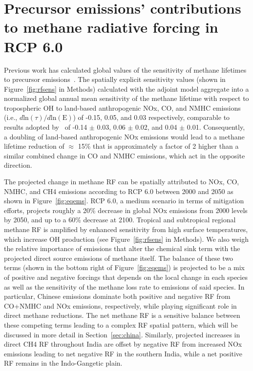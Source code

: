 \section{Precursor emissions' contributions to methane radiative forcing in RCP 6.0}

Previous work has calculated global values of the sensitivity of methane lifetimes to precursor emissions~\citep{ref:fry2012,ref:holmes2013}. The spatially explicit sensitivity values (shown in Figure~\ref{fig:rfsens} in Methods) calculated with the adjoint model aggregate into a normalized global annual mean sensitivity of the methane lifetime with respect to tropospheric OH to land-based anthropogenic NOx, CO, and NMHC emissions (i.e., $d \mathrm{ln}(\tau)/d\mathrm{ln}(\mathrm{E})$) of -0.15, 0.05, and 0.03 respectively, comparable to results adopted by~\citet{ref:holmes2013} of -0.14 $\pm$ 0.03, 0.06 $\pm$ 0.02, and 0.04 $\pm$ 0.01. Consequently, a doubling of land-based anthropogenic NOx emissions would lead to a methane lifetime reduction of $\approx$ 15\% that is approximately a factor of 2 higher than a similar combined change in CO and NMHC emissions, which act in the opposite direction.  


The projected change in methane RF can be spatially attributed to NOx, CO, NMHC, and CH4 emissions according to RCP 6.0 between 2000 and 2050 as shown in Figure~\ref{fig:eqems}. RCP 6.0, a medium scenario in terms of mitigation efforts, projects roughly a 20\% decrease in global NOx emissions from 2000 levels by 2050, and up to a 60\% decrease at 2100. Tropical and subtropical regional methane RF is amplified by enhanced sensitivity from high surface temperatures, which increase OH production (see Figure~\ref{fig:rfsens} in Methods). We also weigh the relative importance of emissions that alter the chemical sink term with the projected direct source emissions of methane itself. The balance of these two terms (shown in the bottom right of Figure~\ref{fig:eqems}) is projected to be a mix of positive and negative forcings that depends on the local change in each species as well as the sensitivity of the methane loss rate to emissions of said species. In particular, Chinese emissions dominate both positive and negative RF from CO+NMHC and NOx emissions, respectively, while playing significant role in direct methane reductions.  The net methane RF is a sensitive balance between these competing terms leading to a complex RF spatial pattern, which will be discussed in more detail in Section~\ref{sec:china}.  Similarly, projected increases in direct CH4 RF throughout India are offset by negative RF from increased NOx emissions leading to net negative RF in the southern India, while a net positive RF remains in the Indo-Gangetic plain.  

